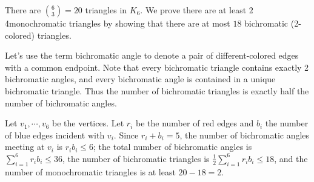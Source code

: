 There are $\binom{6}{3} = 20$ triangles in $K_6$. We prove there are at least $2$ 4monochromatic triangles by showing that there are at most $18$ bichromatic (2-colored) triangles.

Let's use the term bichromatic angle to denote a pair of different-colored edges with a common endpoint. Note that every bichromatic triangle contains exactly 2 bichromatic angles, and every bichromatic angle is contained in a unique bichromatic triangle. Thus the number of bichromatic triangles is exactly half the number of bichromatic angles.

Let $v_1, \cdots, v_6$ be the vertices. Let $r_i$ be the number of red edges and $b_i$ the number of blue edges incident with $v_i$. Since $r_i + b_i = 5$, the number of bichromatic angles meeting at $v_i$ is $r_ib_i \le 6$; the total number of bichromatic angles is $\sum_{i = 1}^{6} r_ib_i \le 36$, the number of bichromatic triangles is $\frac{1}{2} \sum_{i = 1}^{6} r_ib_i \le 18$, and the number of monochromatic triangles is at least $20−18=2$.
